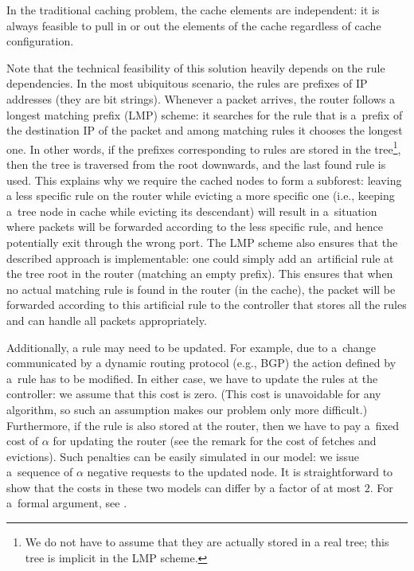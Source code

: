 In the traditional caching problem, the cache elements are independent: it is always feasible to pull in or out the elements of the cache regardless of cache configuration.

Note that the technical feasibility of this solution heavily depends on the
rule dependencies. In the most ubiquitous scenario, the rules are prefixes of
IP addresses (they are bit strings). Whenever a packet arrives, the router
follows a longest matching prefix (LMP) scheme: it searches for the rule that
is a~prefix of the destination IP of the packet and among matching rules it
chooses the longest one. In other words, if the prefixes corresponding to
rules are stored in the tree\footnote{We do not have to assume that they are
actually stored in a real tree; this tree is implicit in the LMP scheme.},
then the tree is traversed from the root downwards, and the last found rule is
used. This explains why we require the cached nodes to form a subforest:
leaving a less specific rule on the router while evicting a more specific one
(i.e., keeping a~tree node in cache while evicting its descendant) will result
in a~situation where packets will be forwarded according to the less specific
rule, and hence potentially exit through the wrong port. The LMP scheme also
ensures that the described approach is implementable: one could simply add
an~artificial rule at the tree root in the router (matching an empty prefix).
This ensures that when no actual matching rule is found in the router (in the
cache), the packet will be forwarded according to this artificial rule to the
controller that stores all the rules and can handle all packets appropriately.

Additionally, a rule may need to be updated. For example, due to a~change
communicated by a dynamic routing protocol (e.g., BGP) the action defined by
a~rule has to be modified. In either case, we have to update the rules at the
controller: we assume that this cost is zero. (This cost is unavoidable for
any algorithm, so such an assumption makes our problem only more difficult.)
Furthermore, if the rule is also stored at the router, then we have to pay a~fixed
cost of $\alpha$ for updating the router (see the remark for the cost of
fetches and evictions). Such penalties can be easily simulated in our model:
we issue a~sequence of $\alpha$ negative requests to the updated node.  It is
straightforward to show that the costs in these two models can differ by a
factor of at most $2$. For a~formal argument, see
.




